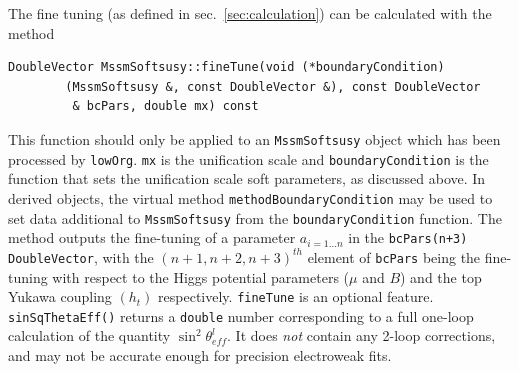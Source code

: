 \documentclass{article}
\def\code#1{\small{\tt #1}\normalsize}
\begin{document}
The fine tuning (as defined in sec.~\ref{sec:calculation}) can be
calculated with the method 
\small
\begin{verbatim}
DoubleVector MssmSoftsusy::fineTune(void (*boundaryCondition)
        (MssmSoftsusy &, const DoubleVector &), const DoubleVector 
         & bcPars, double mx) const 
\end{verbatim}
\normalsize
This function should only be applied to an \code{MssmSoftsusy} object which
has been processed by \code{lowOrg}. \code{mx} is the unification scale and
\code{boundaryCondition} is the function that sets the unification scale soft
parameters, as discussed above. 
In derived objects, the virtual method
\code{methodBoundaryCondition} may be used to set data additional to
\code{MssmSoftsusy} from the \code{boundaryCondition} function. 
The method outputs the fine-tuning of a
parameter $a_{i=1\ldots n}$ in the \code{bcPars(n+3)} \code{DoubleVector}, 
with the $(n+1,n+2,n+3)^{th}$ element
of \code{bcPars} being the fine-tuning with respect to the Higgs potential
parameters ($\mu$ and $B$) and
the top Yukawa coupling
$(h_t)$ respectively. \code{fineTune} is an optional feature.
\code{sinSqThetaEff()} returns a \code{double} number corresponding to a full
one-loop calculation of the quantity $\sin^2 \theta_{eff}^l$. It does {\em
  not}\/ contain any 2-loop corrections, and may not be accurate enough for
precision electroweak fits. 
\end{document}
